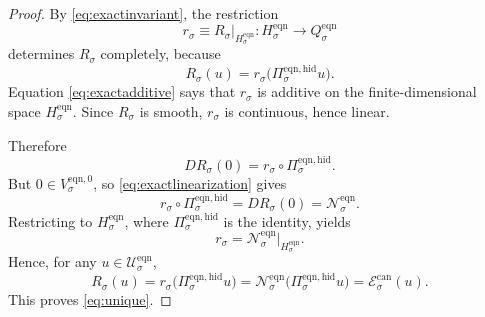 \documentclass[11pt]{article}
\newcommand{\EqnSpace}[1]{\mathcal U_{#1}^{\mathrm{eqn}}}
\newcommand{\EqnTarget}[1]{Q_{#1}^{\mathrm{eqn}}}
\newcommand{\EqnResidualCan}[1]{\mathcal E_{#1}^{\mathrm{can}}}
\newcommand{\EqnZero}[1]{V_{#1}^{\mathrm{eqn},0}}
\newcommand{\EqnHidden}[1]{H_{#1}^{\mathrm{eqn}}}
\newcommand{\EqnProj}[1]{\Pi_{#1}^{\mathrm{eqn,hid}}}
\newcommand{\EqnLin}[1]{\mathcal N_{#1}^{\mathrm{eqn}}}
\begin{document}
\begin{proof}
By \eqref{eq:exactinvariant}, the restriction
\[
r_{\sigma}\equiv R_{\sigma}\big|_{\EqnHidden{\sigma}}:\EqnHidden{\sigma}\to\EqnTarget{\sigma}
\]
determines \(R_{\sigma}\) completely, because
\[
R_{\sigma}(u)=r_{\sigma}\bigl(\EqnProj{\sigma}u\bigr).
\]
Equation \eqref{eq:exactadditive} says that \(r_{\sigma}\) is additive on the finite-dimensional space \(\EqnHidden{\sigma}\). Since \(R_{\sigma}\) is smooth, \(r_{\sigma}\) is continuous, hence linear.

Therefore
\[
DR_{\sigma}(0)=r_{\sigma}\circ \EqnProj{\sigma}.
\]
But \(0\in\EqnZero{\sigma}\), so \eqref{eq:exactlinearization} gives
\[
r_{\sigma}\circ \EqnProj{\sigma}
=
DR_{\sigma}(0)
=
\EqnLin{\sigma}.
\]
Restricting to \(\EqnHidden{\sigma}\), where \(\EqnProj{\sigma}\) is the identity, yields
\[
r_{\sigma}=\EqnLin{\sigma}\big|_{\EqnHidden{\sigma}}.
\]
Hence, for any \(u\in\EqnSpace{\sigma}\),
\[
R_{\sigma}(u)
=
r_{\sigma}\bigl(\EqnProj{\sigma}u\bigr)
=
\EqnLin{\sigma}\bigl(\EqnProj{\sigma}u\bigr)
=
\EqnResidualCan{\sigma}(u).
\]
This proves \eqref{eq:unique}.
\end{proof}
\end{document}
